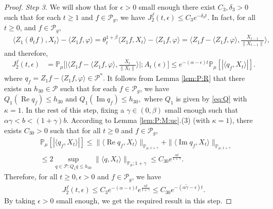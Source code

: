 \documentclass[12pt,a4paper]{amsart}
\theoremstyle{plain}
\theoremstyle{definition}
\numberwithin{equation}{section}
\begin{document}
\begin{proof}
\emph{Step 3.}
We will show that for $\epsilon>0$ small enough there exist $C_3, \delta_3 > 0$ such that for each $t \geq 1$ and $f\in \mathcal P_g$,  we have $ J^f_2(t,\epsilon) \leq C_3 e^{-\delta_3 t}$.
In fact, for all $t\geq 0$, and $f\in \mathcal P_g$,
\begin{align}
  & \langle Z_1(\theta_t f),X_{t}\rangle- \langle Z_1f, \varphi\rangle
     = \theta_t^{1+\beta} \langle Z_1 f,X_t\rangle - \langle  Z_1 f,\varphi \rangle
   =\Big\langle Z_1f - \langle  Z_1 f ,\varphi \rangle, \frac{X_{t-1}}{\|X_{t-1}\|}\Big\rangle,
\end{align}
and therefore,
\begin{align}
  \label{eq: prevJ2}
  J^f_2(t,\epsilon)
  & = \mathbb P_\mu\Big[\Big| \Big\langle Z_1f - \langle  Z_1 f ,\varphi \rangle, \frac{X_t}{\|X_t\|}\Big\rangle \Big|;A_t(\epsilon)\Big] 
   \leq e^{-(\alpha-\epsilon)t} \mathbb{P}_{\mu}[| \langle q_f,X_t \rangle |].
\end{align}
where
\(
  q_f
  = Z_1 f-\langle  Z_1 f,\varphi\rangle \in \mathcal P^*.
\)
It follows from Lemma \ref{lem:P:R} that there exists an $h_{30}\in \mathcal{P}$ such that for each $ f\in \mathcal P_g$, we have
\(
  Q_1 (\operatorname{Re} q_f) \leq h_{30}
  \text{ and } Q_1 (\operatorname{Im} q_f)\leq h_{30},
\)
where $Q_1$ is given by \eqref{eq:Q} with $\kappa=1$.
In the rest of this step, fixing a $\gamma\in(0,\beta)$ small enough such that $\alpha \gamma < b < (1+\gamma)b$.
According to Lemma \ref{lem:P:M:uc}.(3) (with $\kappa=1$), there exists $C_{30}>0$ such that for all $t\geq 0$ and $f\in \mathcal P_g$,
\begin{align}
  & \mathbb{P}_{\mu}\left[\left|\langle q_f,X_{t}\rangle\right|\right]
    \leq \|\langle \operatorname{Re} q_f, X_{t}\rangle\|_{\mathbb{P}_{\mu,1+\gamma}} + \|\langle \operatorname{Im} q_f, X_{t}\rangle\|_{\mathbb{P}_{\mu,1+\gamma}} \\
  & \leq 2\sup_{q\in \mathcal P: Q_1 q\leq h_{30}} \|\langle q, X_t\rangle\|_{\mathbb P_\mu; 1+\gamma} \leq C_{30} e^{\frac{\alpha t}{1+\gamma}}.
\end{align}
Therefore, for all $t\geq 0, \epsilon > 0$ and $f \in \mathcal P_g$, we have
\begin{align}
  \label{eq: right bound for J2}
   J^f_2(t, \epsilon)
    \leq  C_3 e^{-(\alpha-\epsilon)t}e^{\frac{\alpha t}{1+\gamma}} 
\leq C_{30} e^{-(\alpha\tilde \gamma -\epsilon)t}.
\end{align}
By taking $\epsilon >0$ small enough, we get the required result in this step.


\end{proof}
\end{document}
